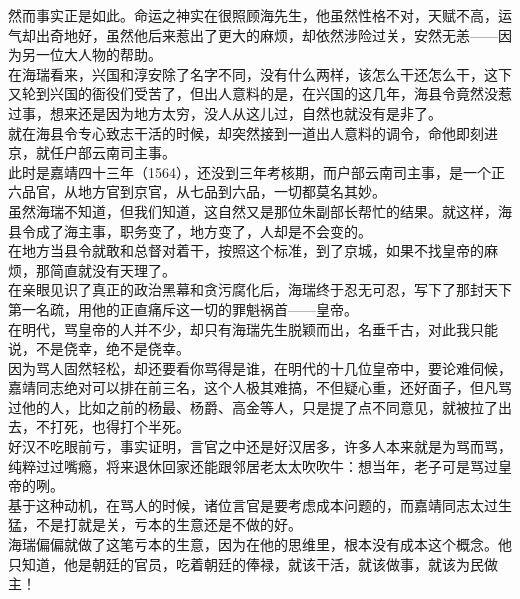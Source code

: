 \begin{multicols}{\theparacolNo}
然而事实正是如此。命运之神实在很照顾海先生，他虽然性格不对，天赋不高，运气却出奇地好，虽然他后来惹出了更大的麻烦，却依然涉险过关，安然无恙——因为另一位大人物的帮助。\\

在海瑞看来，兴国和淳安除了名字不同，没有什么两样，该怎么干还怎么干，这下又轮到兴国的衙役们受苦了，但出人意料的是，在兴国的这几年，海县令竟然没惹过事，想来还是因为地方太穷，没人从这儿过，自然也就没有是非了。\\

就在海县令专心致志干活的时候，却突然接到一道出人意料的调令，命他即刻进京，就任户部云南司主事。\\

此时是嘉靖四十三年（1564），还没到三年考核期，而户部云南司主事，是一个正六品官，从地方官到京官，从七品到六品，一切都莫名其妙。\\

虽然海瑞不知道，但我们知道，这自然又是那位朱副部长帮忙的结果。就这样，海县令成了海主事，职务变了，地方变了，人却是不会变的。\\

在地方当县令就敢和总督对着干，按照这个标准，到了京城，如果不找皇帝的麻烦，那简直就没有天理了。\\

在亲眼见识了真正的政治黑幕和贪污腐化后，海瑞终于忍无可忍，写下了那封天下第一名疏，用他的正直痛斥这一切的罪魁祸首——皇帝。\\

在明代，骂皇帝的人并不少，却只有海瑞先生脱颖而出，名垂千古，对此我只能说，不是侥幸，绝不是侥幸。\\

因为骂人固然轻松，却还要看你骂得是谁，在明代的十几位皇帝中，要论难伺候，嘉靖同志绝对可以排在前三名，这个人极其难搞，不但疑心重，还好面子，但凡骂过他的人，比如之前的杨最、杨爵、高金等人，只是提了点不同意见，就被拉了出去，不打死，也得打个半死。\\

好汉不吃眼前亏，事实证明，言官之中还是好汉居多，许多人本来就是为骂而骂，纯粹过过嘴瘾，将来退休回家还能跟邻居老太太吹吹牛：想当年，老子可是骂过皇帝的咧。\\

基于这种动机，在骂人的时候，诸位言官是要考虑成本问题的，而嘉靖同志太过生猛，不是打就是关，亏本的生意还是不做的好。\\

海瑞偏偏就做了这笔亏本的生意，因为在他的思维里，根本没有成本这个概念。他只知道，他是朝廷的官员，吃着朝廷的俸禄，就该干活，就该做事，就该为民做主！\\


\end{multicols}
